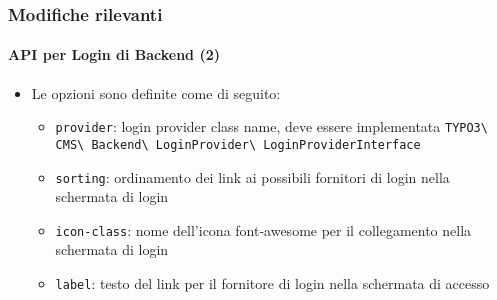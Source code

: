 \begin{frame}[fragile]
	\frametitle{Modifiche rilevanti}
	\framesubtitle{API per Login di Backend (2)}

	\begin{itemize}

		\item Le opzioni sono definite come di seguito:

			\begin{itemize}

				\item \texttt{provider}:\newline
					login provider class name, deve essere implementata
						\texttt{TYPO3\textbackslash
							CMS\textbackslash
							Backend\textbackslash
							LoginProvider\textbackslash
							LoginProviderInterface}

				\item \texttt{sorting}:\newline
					ordinamento dei link ai possibili fornitori di login nella schermata di login

				\item \texttt{icon-class}:\newline
					nome dell'icona font-awesome per il collegamento nella schermata di login
					
				\item \texttt{label}:\newline
					testo del link per il fornitore di login nella schermata di accesso
			\end{itemize}

	\end{itemize}

\end{frame}


